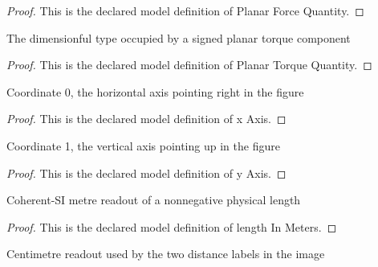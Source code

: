 \begin{proof}
  This is the declared model definition of Planar Force Quantity.
\end{proof}
\begin{definition}
  \label{def:physics:phyx-mini-0707:phyxminiproblems-problemphyxmini0707-planartorquequantity}
  The dimensionful type occupied by a signed planar torque component
\end{definition}
\begin{proof}
  This is the declared model definition of Planar Torque Quantity.
\end{proof}
\begin{definition}[x Axis]
  \label{def:physics:phyx-mini-0707:phyxminiproblems-problemphyxmini0707-xaxis}
  Coordinate 0, the horizontal axis pointing right in the figure
\end{definition}
\begin{proof}
  This is the declared model definition of x Axis.
\end{proof}
\begin{definition}[y Axis]
  \label{def:physics:phyx-mini-0707:phyxminiproblems-problemphyxmini0707-yaxis}
  Coordinate 1, the vertical axis pointing up in the figure
\end{definition}
\begin{proof}
  This is the declared model definition of y Axis.
\end{proof}
\begin{definition}
  \label{def:physics:phyx-mini-0707:phyxminiproblems-problemphyxmini0707-lengthinmeters}
  Coherent-SI metre readout of a nonnegative physical length
\end{definition}
\begin{proof}
  This is the declared model definition of length In Meters.
\end{proof}
\begin{definition}
  \label{def:physics:phyx-mini-0707:phyxminiproblems-problemphyxmini0707-lengthincentimeters}
  Centimetre readout used by the two distance labels in the image
\end{definition}
